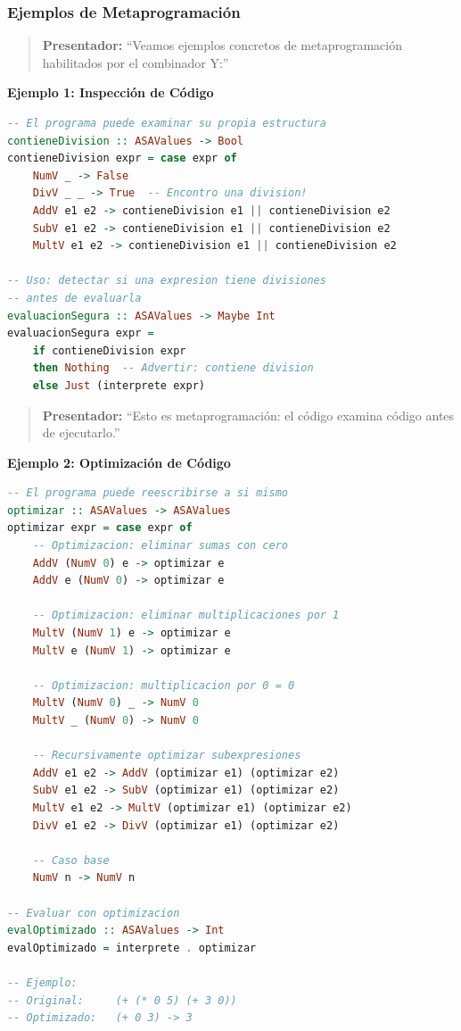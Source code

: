 \documentclass[12pt]{article}
\begin{document}
\subsubsection*{Ejemplos de Metaprogramación}

\begin{quote}
\textbf{Presentador:} ``Veamos ejemplos concretos de metaprogramación habilitados por el combinador Y:''
\end{quote}

\textbf{Ejemplo 1: Inspección de Código}

\begin{lstlisting}[language=Haskell, caption=Analizar estructura del programa]
-- El programa puede examinar su propia estructura
contieneDivision :: ASAValues -> Bool
contieneDivision expr = case expr of
    NumV _ -> False
    DivV _ _ -> True  -- Encontro una division!
    AddV e1 e2 -> contieneDivision e1 || contieneDivision e2
    SubV e1 e2 -> contieneDivision e1 || contieneDivision e2
    MultV e1 e2 -> contieneDivision e1 || contieneDivision e2

-- Uso: detectar si una expresion tiene divisiones
-- antes de evaluarla
evaluacionSegura :: ASAValues -> Maybe Int
evaluacionSegura expr =
    if contieneDivision expr
    then Nothing  -- Advertir: contiene division
    else Just (interprete expr)
\end{lstlisting}

\begin{quote}
\textbf{Presentador:} ``Esto es metaprogramación: el código examina código antes de ejecutarlo.''
\end{quote}

\newpage
\textbf{Ejemplo 2: Optimización de Código}

\begin{lstlisting}[language=Haskell, caption=Transformar y optimizar programas]
-- El programa puede reescribirse a si mismo
optimizar :: ASAValues -> ASAValues
optimizar expr = case expr of
    -- Optimizacion: eliminar sumas con cero
    AddV (NumV 0) e -> optimizar e
    AddV e (NumV 0) -> optimizar e

    -- Optimizacion: eliminar multiplicaciones por 1
    MultV (NumV 1) e -> optimizar e
    MultV e (NumV 1) -> optimizar e

    -- Optimizacion: multiplicacion por 0 = 0
    MultV (NumV 0) _ -> NumV 0
    MultV _ (NumV 0) -> NumV 0

    -- Recursivamente optimizar subexpresiones
    AddV e1 e2 -> AddV (optimizar e1) (optimizar e2)
    SubV e1 e2 -> SubV (optimizar e1) (optimizar e2)
    MultV e1 e2 -> MultV (optimizar e1) (optimizar e2)
    DivV e1 e2 -> DivV (optimizar e1) (optimizar e2)

    -- Caso base
    NumV n -> NumV n

-- Evaluar con optimizacion
evalOptimizado :: ASAValues -> Int
evalOptimizado = interprete . optimizar

-- Ejemplo:
-- Original:     (+ (* 0 5) (+ 3 0))
-- Optimizado:   (+ 0 3) -> 3
\end{lstlisting}
\end{document}

